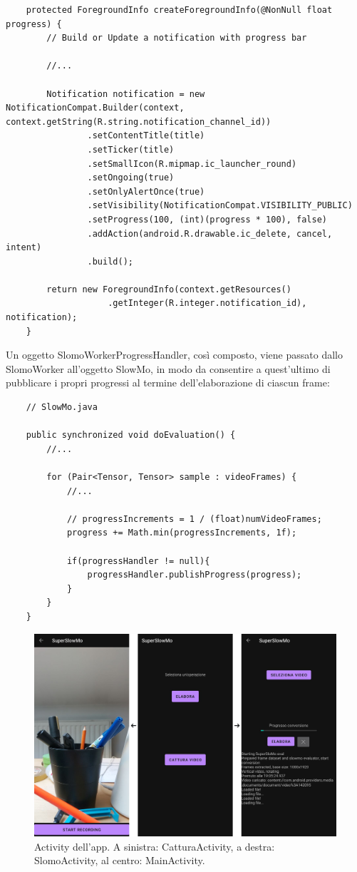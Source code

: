 \begin{lstlisting}
    protected ForegroundInfo createForegroundInfo(@NonNull float progress) {
        // Build or Update a notification with progress bar

        //...

        Notification notification = new NotificationCompat.Builder(context, context.getString(R.string.notification_channel_id))
                .setContentTitle(title)
                .setTicker(title)
                .setSmallIcon(R.mipmap.ic_launcher_round)
                .setOngoing(true)
                .setOnlyAlertOnce(true)
                .setVisibility(NotificationCompat.VISIBILITY_PUBLIC)
                .setProgress(100, (int)(progress * 100), false)
                .addAction(android.R.drawable.ic_delete, cancel, intent)
                .build();

        return new ForegroundInfo(context.getResources()
                    .getInteger(R.integer.notification_id), notification);
    }
\end{lstlisting}

Un oggetto SlomoWorkerProgressHandler, così composto, viene passato dallo SlomoWorker all'oggetto SlowMo, in modo da
consentire a quest'ultimo di pubblicare i propri progressi al termine dell'elaborazione di ciascun frame:

\begin{lstlisting}
    // SlowMo.java

    public synchronized void doEvaluation() {
        //...

        for (Pair<Tensor, Tensor> sample : videoFrames) {
            //...

            // progressIncrements = 1 / (float)numVideoFrames;
            progress += Math.min(progressIncrements, 1f);

            if(progressHandler != null){
                progressHandler.publishProgress(progress);
            }
        }
    }
\end{lstlisting}


\begin{figure}[p]
    \centering
    \includegraphics[width=\textwidth]{img/screenshot_app.jpg}
    \caption{Activity dell'app. A sinistra: CatturaActivity, a destra: SlomoActivity,
    al centro: MainActivity.}
\end{figure}

